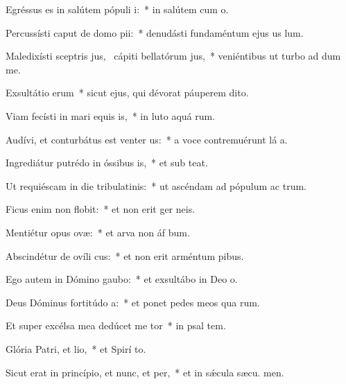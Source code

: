 \item Egréssus es in salútem pópuli i:~* in salútem cum  o.
\item Percussísti caput de domo pii:~* denudásti fundaméntum ejus us  lum.
\item Maledixísti sceptris jus,~\pscross{} cápiti bellatórum jus,~* veniéntibus ut turbo ad dum me.
\item Exsultátio erum~* sicut ejus, qui dévorat páuperem  dito.
\item Viam fecísti in mari equis is,~* in luto aquá rum.
\item Audívi, et conturbátus est venter us:~* a voce contremuérunt lá a.
\item Ingrediátur putrédo in óssibus is,~* et sub  teat.
\item Ut requiéscam in die tribulatinis:~* ut ascéndam ad pópulum ac trum.
\item Ficus enim non flobit:~* et non erit ger  neis.
\item Mentiétur opus ovæ:~* et arva non áf bum.
\item Abscindétur de ovíli cus:~* et non erit arméntum  pibus.
\item Ego autem in Dómino gaubo:~* et exsultábo in Deo  o.
\item Deus Dóminus fortitúdo a:~* et ponet pedes meos qua rum.
\item Et super excélsa mea dedúcet me tor~* in psal tem.
\item Glória Patri, et lio,~* et Spirí to.
\item Sicut erat in princípio, et nunc, et per,~* et in sǽcula sæcu. men.
